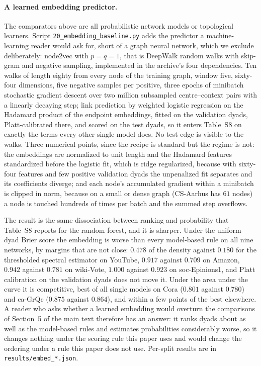 \documentclass[12pt]{article}
\begin{document}
\paragraph{A learned embedding predictor.}
The comparators above are all probabilistic network models or topological learners. Script \texttt{20\_embedding\_baseline.py} adds the predictor a machine-learning reader would ask for, short of a graph neural network, which we exclude deliberately: node2vec \citep{GroverLeskovec2016} with $p=q=1$, that is DeepWalk random walks with skip-gram and negative sampling, implemented in the archive's four dependencies. Ten walks of length eighty from every node of the training graph, window five, sixty-four dimensions, five negative samples per positive, three epochs of minibatch stochastic gradient descent over two million subsampled centre--context pairs with a linearly decaying step; link prediction by weighted logistic regression on the Hadamard product of the endpoint embeddings, fitted on the validation dyads, Platt-calibrated there, and scored on the test dyads, so it enters Table~S8 on exactly the terms every other single model does. No test edge is visible to the walks. Three numerical points, since the recipe is standard but the regime is not: the embeddings are normalized to unit length and the Hadamard features standardized before the logistic fit, which is ridge regularized, because with sixty-four features and few positive validation dyads the unpenalized fit separates and its coefficients diverge; and each node's accumulated gradient within a minibatch is clipped in norm, because on a small or dense graph (CS-Aarhus has $61$ nodes) a node is touched hundreds of times per batch and the summed step overflows.

The result is the same dissociation between ranking and probability that Table~S8 reports for the random forest, and it is sharper. Under the uniform-dyad Brier score the embedding is worse than every model-based rule on all nine networks, by margins that are not close: $0.478$ of the density against $0.180$ for the thresholded spectral estimator on YouTube, $0.917$ against $0.709$ on Amazon, $0.942$ against $0.781$ on wiki-Vote, $1.000$ against $0.923$ on soc-Epinions1, and Platt calibration on the validation dyads does not move it. Under the area under the curve it is competitive, best of all single models on Cora ($0.801$ against $0.780$) and ca-GrQc ($0.875$ against $0.864$), and within a few points of the best elsewhere. A reader who asks whether a learned embedding would overturn the comparisons of Section~5 of the main text therefore has an answer: it ranks dyads about as well as the model-based rules and estimates probabilities considerably worse, so it changes nothing under the scoring rule this paper uses and would change the ordering under a rule this paper does not use. Per-split results are in \texttt{results/embed\_*.json}.
\end{document}
